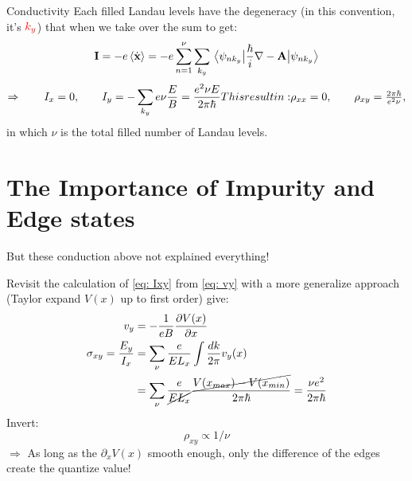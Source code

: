 \documentclass{beamer}
\begin{document}
\begin{frame}{Conductivity}
\quad Each filled Landau levels have the degeneracy (in this convention, it's \({\color{red} k_y}\)) that when we take over the sum to get:
$$\textbf{I} = -e \ev{\dot{\textbf{x}}} = - e \sum_{n = 1}^\nu \sum_{k_y} \ev{\frac{\hbar}{i}\nabla - \textbf{A}}{\psi_{n k_y}}$$
\begin{equation}\label{eq: Ixy}
	\Rightarrow \qquad I_x = 0,\qquad I_y = -\sum_{k_y}e\nu\frac{E}{B} = \frac{e^2 \nu E}{2\pi \hbar}$$
	This result in:
	$$\rho_{xx} = 0, \qquad\rho_{xy} = \frac{2\pi \hbar}{e^2 \nu},
\end{equation}
in which \(\nu\) is the total filled number of Landau levels.
\end{frame}
	\section{The Importance of Impurity and Edge states}
\begin{frame}
\begin{center}
	But these conduction above not explained everything!
\end{center}
Revisit the calculation of \eqref{eq: Ixy} from \eqref{eq: vy} with a more generalize approach (Taylor expand \(V(x)\) up to first order) give:
		\begin{align}
			v_y &= - \frac{1}{eB} \pdv{V(x)}{x}\\
			\sigma_{xy} = \frac{E_y}{I_x} &=\sum_\nu \frac{e}{E L_x}\int\frac{dk}{2\pi} v_y (x) \nonumber\\&=\sum_\nu \frac{e}{\cancel{E L_x}}\frac{\cancel{V(x_{max}) - V(x_{min})}}{2\pi \hbar} = \frac{\nu e^2}{2\pi\hbar}
		\end{align}
Invert: $$\rho_{xy}\propto 1/\nu$$
\vspace{0.3cm}
$\Rightarrow$ As long as the \(\partial_x V(x)\) smooth enough, only the difference of the edges create the quantize value!
\end{frame}
\end{document}
